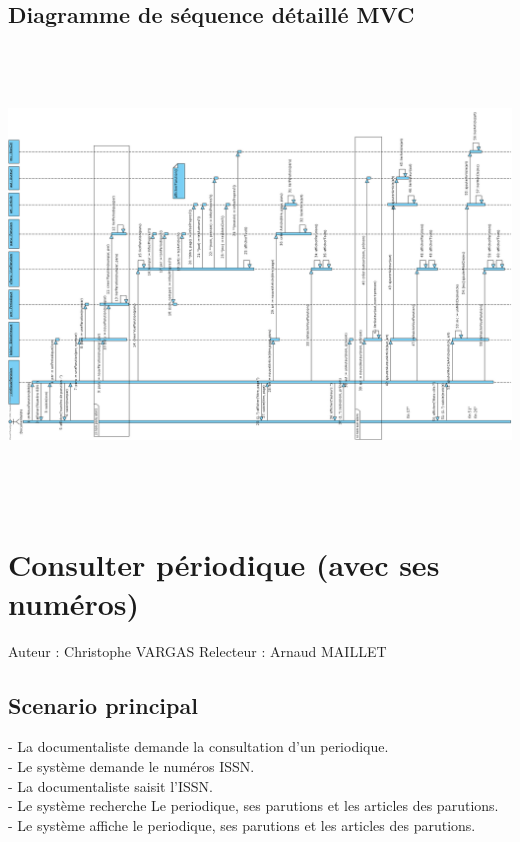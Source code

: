 \documentclass[a4paper,10pt]{report}
\begin{document}
\section*{Diagramme de séquence détaillé MVC}
\includegraphics[height=120mm]{NouvNumPerMVC.png}

\newpage


\chapter*{Consulter périodique (avec ses numéros)}

Auteur : Christophe VARGAS
Relecteur : Arnaud MAILLET

\bigskip
\section*{Scenario principal}
\begin{flushleft}
- La documentaliste demande la consultation d'un periodique.\\
- Le système demande le numéros ISSN.\\
- La documentaliste saisit l'ISSN.\\
- Le système recherche Le periodique, ses parutions et les articles des parutions.\\
- Le système affiche le periodique, ses parutions et les articles des parutions.\\
\end{flushleft}
\end{document}
